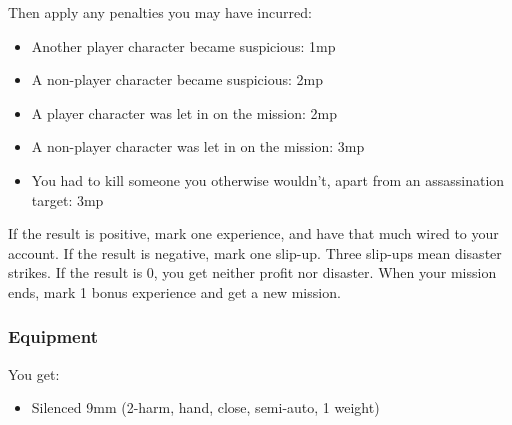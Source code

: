 Then apply any penalties you may have incurred:
\begin{itemize}
\item Another player character became suspicious: 1mp
\item A non-player character became suspicious: 2mp
\item A player character was let in on the mission: 2mp
\item A non-player character was let in on the mission: 3mp
\item You had to kill someone you otherwise wouldn't, apart from an assassination target: 3mp
\end{itemize}

If the result is positive, mark one experience, and have that much \money wired to your account. If the result is negative, mark one slip-up. Three slip-ups mean disaster strikes. If the result is 0, you get neither profit nor disaster. When your mission ends, mark 1 bonus experience and get a new mission.



\subsubsection{Equipment}
You get:
\begin{itemize}
\item Silenced 9mm (2-harm, hand, close, semi-auto, 1 weight)
\end{itemize}

